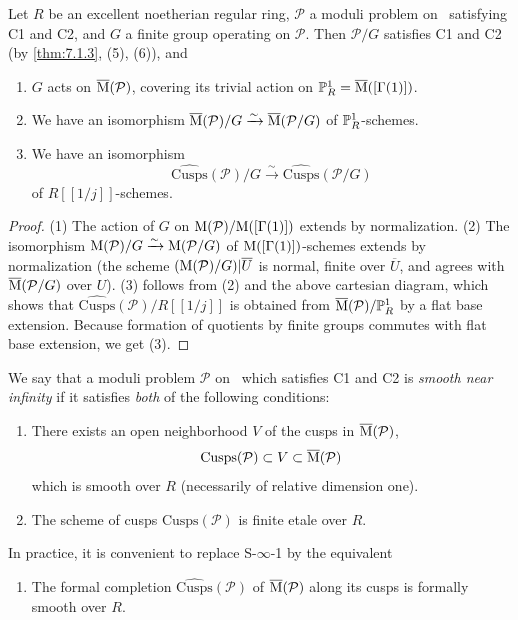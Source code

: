 \begin{kprop}\label{prop:8.6.4}
Let $R$ be an excellent noetherian regular ring, $\mathcal{P}$ a moduli problem on \EllR\ satisfying C1 and C2, and $G$ a finite group operating on $\mathcal{P}$. Then $\mathcal{P}/G$ satisfies C1 and C2 (by \ref{thm:7.1.3}, (5), (6)), and
\begin{enumerate}[(1)]
\item $G$ acts on $\overline{\mathrm{M}}(\mathcal{P})$, covering its trivial action on $\mathbb{P}^1_R = \overline{\mathrm{M}}([\Gamma(1)])$.
\item We have an isomorphism $\overline{\mathrm{M}}(\mathcal{P})/G \xrightarrow{\sim} \overline{\mathrm{M}}(\mathcal{P}/G)$ of $\mathbb{P}^1_R$-schemes.
\item We have an isomorphism
\[
\widehat{\mathrm{Cusps}}(\mathcal{P})/G \xrightarrow{\sim} \widehat{\mathrm{Cusps}}(\mathcal{P}/G)
\]
of $R[[1/j]]$-schemes.
\end{enumerate}
\end{kprop}

\begin{proof}
(1) The action of $G$ on $\mathrm{M}(\mathcal{P})/\mathrm{M}([\Gamma(1)])$ extends by normalization. (2) The isomorphism $\mathrm{M}(\mathcal{P})/G \xrightarrow{\sim} \mathrm{M}(\mathcal{P}/G)$ of $\mathrm{M}([\Gamma(1)])$-schemes extends by normalization (the scheme $(\mathrm{M}(\mathcal{P})/G)|\overline{U}$ is normal, finite over $\overline{U}$, and agrees with $\overline{\mathrm{M}}(\mathcal{P}/G)$ over $U$). (3) follows from (2) and the above cartesian diagram, which shows that $\widehat{\mathrm{Cusps}}(\mathcal{P})/R[[1/j]]$ is obtained from $\overline{\mathrm{M}}(\mathcal{P})/\mathbb{P}^1_R$ by a flat base extension. Because formation of quotients by finite groups commutes with flat base extension, we get (3).
\end{proof}

\begin{definition}\label{def:8.6.5}
We say that a moduli problem $\mathcal{P}$ on \EllR\ which satisfies C1 and C2 is \emph{smooth near infinity} if it satisfies \emph{both} of the following conditions:
\begin{enumerate}[label=\textbf{S-$\infty$-\arabic*.}]
\item There exists an open neighborhood $V$ of the cusps in $\overline{\mathrm{M}}(\mathcal{P})$,
\[
\mathrm{Cusps}(\mathcal{P}) \subset V \subset \overline{\mathrm{M}}(\mathcal{P})
\]
which is smooth over $R$ (necessarily of relative dimension one).
\item The scheme of cusps $\mathrm{Cusps}(\mathcal{P})$ is finite etale over $R$.
\end{enumerate}
In practice, it is convenient to replace S-$\infty$-1 by the equivalent
\begin{enumerate}[label=\textbf{S-$\infty$-1 bis.}]
\item The formal completion $\widehat{\mathrm{Cusps}}(\mathcal{P})$ of $\overline{\mathrm{M}}(\mathcal{P})$ along its cusps is formally smooth over $R$.
\end{enumerate}
\end{definition}

